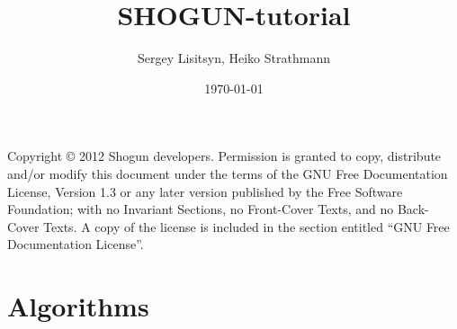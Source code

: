 \documentclass{shogun_tutorial}
\title{SHOGUN-tutorial}
\date{\today}
\author{Sergey Lisitsyn, Heiko Strathmann}
\begin{document}
	\maketitle
	Copyright \copyright{}  2012 Shogun developers.
    Permission is granted to copy, distribute and/or modify this document
    under the terms of the GNU Free Documentation License, Version 1.3
    or any later version published by the Free Software Foundation;
    with no Invariant Sections, no Front-Cover Texts, and no Back-Cover Texts.
    A copy of the license is included in the section entitled ``GNU
    Free Documentation License''.
    
    
	\tableofcontents
	\listoftodos
	\part{Algorithms}
	
	
	
	\begin{appendix}
	
	\end{appendix}
	
	
	 
\end{document}
